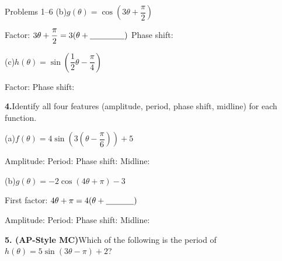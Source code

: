 \documentclass[10pt]{article}
\begin{document}
\begin{notesbox}{Problems 1--6}
\vspace{6pt}
(b)\quad $g(\theta) = \cos\!\left(3\theta + \dfrac{\pi}{2}\right)$

\vspace{2pt}
Factor: $3\theta + \dfrac{\pi}{2} = 3\!\left(\theta + \underline{\hspace{1.5cm}}\right)$
\quad Phase shift: \underline{\hspace{3.5cm}}

\vspace{6pt}
(c)\quad $h(\theta) = \sin\!\left(\dfrac{1}{2}\theta - \dfrac{\pi}{4}\right)$

\vspace{2pt}
Factor: \underline{\hspace{4cm}}
\quad Phase shift: \underline{\hspace{3.5cm}}

\vspace{0.12in}
\textbf{4.}\quad Identify all four features (amplitude, period, phase shift, midline)
for each function.

\vspace{4pt}
(a)\quad $f(\theta) = 4\sin\!\left(3\!\left(\theta - \dfrac{\pi}{6}\right)\right) + 5$

\vspace{4pt}
Amplitude: \underline{\hspace{1.8cm}} \quad
Period: \underline{\hspace{1.8cm}} \quad
Phase shift: \underline{\hspace{2.2cm}} \quad
Midline: \underline{\hspace{1.8cm}}

\vspace{8pt}
(b)\quad $g(\theta) = -2\cos(4\theta + \pi) - 3$

\vspace{4pt}
First factor: $4\theta + \pi = 4\!\left(\theta + \underline{\hspace{1.2cm}}\right)$

\vspace{4pt}
Amplitude: \underline{\hspace{1.8cm}} \quad
Period: \underline{\hspace{1.8cm}} \quad
Phase shift: \underline{\hspace{2.2cm}} \quad
Midline: \underline{\hspace{1.8cm}}

\vspace{0.12in}
\textbf{5. (AP-Style MC)}\quad Which of the following is the period of
$h(\theta) = 5\sin(3\theta - \pi) + 2$?


\end{notesbox}
\end{document}
